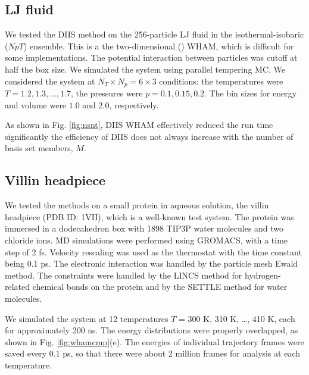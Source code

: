 \documentclass[aip,jcp,preprint,superscriptaddress]{revtex4-1}
\begin{document}
\subsection{\label{sec:results_LJ}
LJ fluid}


We tested the DIIS method
on the 256-particle LJ fluid in the isothermal-isobaric ($NpT$) ensemble.
%
This is a the two-dimensional () WHAM,
which is difficult for some implementations.
%
The potential interaction between particles was cutoff at half the box size.
%
We simulated the system 
using parallel tempering MC.
%
We considered the system
at $N_T \times N_p = 6\times 3$ conditions:
the temperatures were $T = 1.2, 1.3, \dots, 1.7$,
the pressures were $p = 0.1, 0.15, 0.2$.
%
The bin sizes for energy and volume
were $1.0$ and $2.0$, respectively.



As shown in Fig. \ref{fig:nsnt},
DIIS WHAM effectively
reduced the run time significantly
the efficiency of DIIS does not
always increase with
the number of basis set members, $M$.




\subsection{\label{sec:results_villin}
Villin headpiece}



We tested the methods on a small protein in aqueous solution,
the villin headpiece
(PDB ID: 1VII), which is a well-known test system\cite{duan1998}.
%
The protein was immersed in
a dodecahedron box with 1898 TIP3P water molecules and two chloride ions.
%
MD simulations were performed
using GROMACS\cite{
berendsen1995, *lindahl2001, *vanderspoel2005, *hess2008},
with a time step of 2 fs.
%
Velocity rescaling\cite{bussi2007}
was used as the thermostat with
the time constant being 0.1 ps.
%
The electronic interaction was
handled by the particle mesh Ewald method\cite{
essmann1995}.
%
The constraints were handled by the LINCS method\cite{
hess1997}
for hydrogen-related chemical bonds on the protein
and by the SETTLE method\cite{
miyamoto1992}
for water molecules.
%



We simulated the system at 12 temperatures
$T$ = 300 K, 310 K, \dots, 410 K,
each for approximately 200 ns.
%
The energy distributions were properly overlapped,
as shown in Fig. \ref{fig:whamcmp}(e).
%
The energies of individual trajectory frames were saved every 0.1 ps,
so that there were about 2 million frames for analysis
at each temperature.
\end{document}
